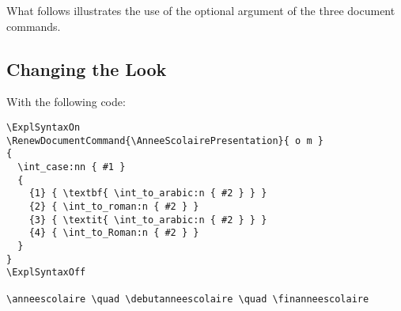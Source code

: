 \documentclass[full]{l3doc}
\begin{document}
\medskip{}

What follows illustrates the use of the optional argument of the three document
commands.


\vspace{\baselineskip}


\subsection{Changing the Look}
\label{sec:changelook}

With the following code:



\begin{Verbatim}[gobble=0, frame=lines, label={code}, labelposition=topline]
\ExplSyntaxOn
\RenewDocumentCommand{\AnneeScolairePresentation}{ o m }
{
  \int_case:nn { #1 }
  {
    {1} { \textbf{ \int_to_arabic:n { #2 } } }
    {2} { \int_to_roman:n { #2 } }
    {3} { \textit{ \int_to_arabic:n { #2 } } }
    {4} { \int_to_Roman:n { #2 } }
  }
}
\ExplSyntaxOff

\anneescolaire \quad \debutanneescolaire \quad \finanneescolaire
\end{Verbatim}
\end{document}
